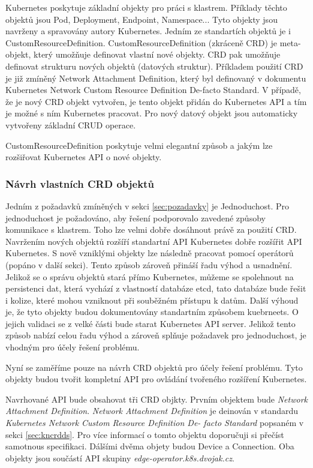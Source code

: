Kubernetes poskytuje základní objekty pro práci s klastrem. Příklady těchto objektů jsou Pod, Deployment, Endpoint, Namespace... Tyto objekty jsou navrženy a spravovány autory Kubernetes. Jedním ze standartích objektů je i CustomResourceDefinition. CustomResourceDefinition (zkráceně CRD) je meta-objekt, který umožňuje definovat vlastní nové objekty. CRD pak umožňuje definovat strukturu nových objektů (datových struktur). Příkladem použití CRD je již zmíněný Network Attachment Definition, který byl definovaný v dokumentu Kubernetes Network Custom Resource Definition De-facto Standard. V případě, že je nový CRD objekt vytvořen, je tento objekt přidán do Kubernetes API a tím je možné s ním Kubernetes pracovat. Pro nový datový objekt jsou automaticky vytvořeny základní CRUD operace.

CustomResourceDefinition poskytuje velmi elegantní způsob a jakým lze rozšiřovat Kubernetes API o nové objekty.  
\subsubsection{Návrh vlastních CRD objektů}\label{CRDDEF}
Jedním z požadavků zmíněných v sekci \ref{sec:pozadavky} je Jednoduchost. Pro jednoduchost je požadováno, aby řešení podporovalo zavedené způsoby komunikace s klastrem. Toho lze velmi dobře dosáhnout právě za použití CRD. Navržením nových objektů rozšíří standartní API Kubernetes dobře rozšířit API Kubernetes. S nově vzniklými objekty lze následně pracovat pomocí operátorů (popáno v další sekci). Tento způsob zároveň přináší řadu výhod a usnadnění. Jelikož se o správu objektů stará přímo Kubernetes, můžeme se spolehnout na persistenci dat, která vychází z vlastností databáze etcd, tato databáze bude řešit i kolize, které mohou vzniknout při souběžném přístupu k datům. Další výhoud je, že tyto objekty budou dokumentovány standartním způsobem kuebrneets. O jejich validaci se z velké části bude starat Kubernetes API server. Jelikož tento způsob nabízí celou řadu výhod a zároveň splňuje požadavek pro jednoduchost, je vhodným pro účely řešení problému.

Nyní se zaměříme pouze na návrh CRD objektů pro účely řešení problému. Tyto objekty budou tvořit kompletní API pro ovládání tvořeného rozšíření Kubernetes.

Navrhované API bude obsahovat tři CRD objkty. Prvním objektem bude \textit{Network Attachment Definition}. \textit{Network Attachment Definition} je deinován v standardu \textit{Kubernetes Network Custom Resource Definition De-
facto Standard} popsaném v sekci \ref{sec:kncrdds}. Pro více informací o tomto objektu doporučuji si přečíst samotnous specifikaci. Dálšími dvěma objety budou Device a Connection. Oba objekty jsou součástí API skupiny \textit{edge-operator.k8s.dvojak.cz}.  
